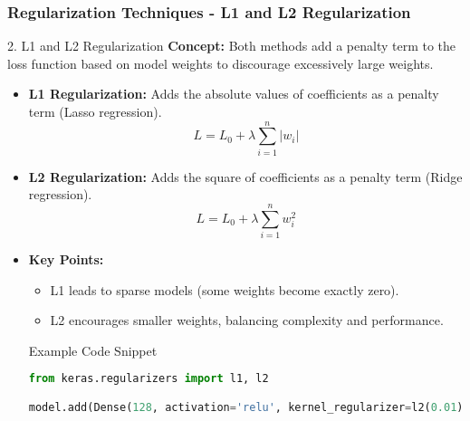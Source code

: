 \documentclass[aspectratio=169]{beamer}
\begin{document}
\begin{frame}[fragile]
    \frametitle{Regularization Techniques - L1 and L2 Regularization}
    \begin{block}{2. L1 and L2 Regularization}
        \textbf{Concept:} Both methods add a penalty term to the loss function based on model weights to discourage excessively large weights.
    \end{block}
    
    \begin{itemize}
        \item \textbf{L1 Regularization:} Adds the absolute values of coefficients as a penalty term (Lasso regression).
        \begin{equation}
        L = L_0 + \lambda \sum_{i=1}^{n} |w_i| 
        \end{equation}
        
        \item \textbf{L2 Regularization:} Adds the square of coefficients as a penalty term (Ridge regression).
        \begin{equation}
        L = L_0 + \lambda \sum_{i=1}^{n} w_i^2 
        \end{equation}
    \end{itemize}
    
    \begin{itemize}
        \item \textbf{Key Points:}
        \begin{itemize}
            \item L1 leads to sparse models (some weights become exactly zero).
            \item L2 encourages smaller weights, balancing complexity and performance.
        \end{itemize}
        
        \begin{block}{Example Code Snippet}
            \begin{lstlisting}[language=Python]
from keras.regularizers import l1, l2

model.add(Dense(128, activation='relu', kernel_regularizer=l2(0.01)))  # L2 regularization
            \end{lstlisting}
        \end{block}
    \end{itemize}
\end{frame}
\end{document}
